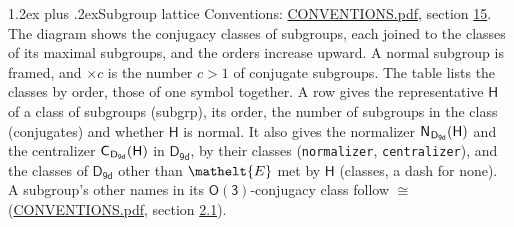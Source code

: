 \documentclass[10pt,a4paper]{article}
\makeatletter
\renewcommand\section{\@startsection{section}{1}{\z@}{-3ex plus -1ex minus -.2ex}%
  {1.2ex plus .2ex}{\normalfont\large\sffamily\bfseries\color{parttitle}}}
\numberwithin{equation}{section}
\newcommand{\eltfont}[1]{{\let\sigma\eltsigma\mathelt{#1}}}
\newcommand{\grp}[1]{\mathsf{#1}}
\newcommand{\cls}[1]{\eltfont{#1}}
\newcommand{\samecls}{\cong}
\newcommand{\hairsp}{\mkern1mu}
\makeatother
\begin{document}
\section{Subgroup lattice}\label{s:subgroups}
Conventions: \href{../../CONVENTIONS.pdf}{CONVENTIONS.pdf}, section \href{../../CONVENTIONS.pdf\#conv.15}{15}.
The diagram shows the conjugacy classes of subgroups, each joined to the classes of its maximal subgroups, and the orders increase upward. A normal subgroup is framed, and ${\times}c$ is the number $c > 1$ of conjugate subgroups. The table lists the classes by order, those of one symbol together. \label{n:group.H}\label{n:head.subgroup}\label{n:head.order}\label{n:head.conjugates}\label{n:head.normal}A row gives the representative $\grp{H}$ of a class of subgroups (subgrp), its order, the number of subgroups in the class (conjugates) and whether $\grp{H}$ is normal. \label{n:group.normalizer}\label{n:group.centralizer}\label{n:head.classes}It also gives the normalizer $\grp{N}_{\hairsp \grp{D_{9d}}}(\grp{H})$ and the centralizer $\grp{C}_{\hairsp \grp{D_{9d}}}(\grp{H})$ in $\grp{D_{9d}}$, by their classes (\texttt{normalizer}, \texttt{centralizer}), and the classes of $\grp{D_{9d}}$ other than $\cls{E}$ met by $\grp{H}$ (classes, a dash for none). A subgroup's other names in its \href{O3.pdf}{$\grp{O(3)}$}-conjugacy class follow $\samecls$ (\href{../../CONVENTIONS.pdf}{CONVENTIONS.pdf}, section \href{../../CONVENTIONS.pdf\#conv.2.1}{2.1}).
\end{document}
